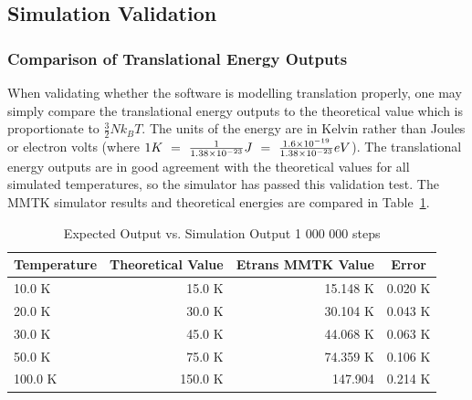 \documentclass[11pt]{article}
\begin{document}
\subsection{Simulation Validation}

\subsubsection{Comparison of Translational Energy Outputs}

When validating whether the software is modelling translation properly, one may simply compare the translational energy outputs to the theoretical value which is proportionate to \begin{math} \frac{3}{2} N k_B T \end{math}. The units of the energy are in Kelvin rather than Joules or electron volts (where \begin{math} 1 K \hspace{0.125cm} = \hspace{0.125cm} \frac{1}{1.38 \times 10^{-23}} J \hspace{0.125cm} = \hspace{0.125cm} \frac{1.6 \times 10^{-19}}{1.38 \times 10^{-23}} eV \end{math}). The translational energy outputs are in good agreement with the theoretical values for all simulated temperatures, so the simulator has passed this validation test. The MMTK simulator results and theoretical energies are compared in Table~\ref{wr-tab-transeng-1}. 


\begin{table}[ht!] 
    \caption{Expected Output vs. Simulation Output 1 000 000 steps}
    \label{wr-tab-transeng-1}
    \centering
    \begin{tabular}{l r r r}
        
        
    \hline
    \multicolumn{1}{c}{\textbf{Temperature}} & \multicolumn{1}{c}{\textbf{Theoretical Value}} & \multicolumn{1}{c}{\textbf{Etrans MMTK Value}} & \multicolumn{1}{c}{\textbf{Error}} \\
    \hline
    10.0 K & 15.0 K & 15.148 K & 0.020 K \\ 
    \hline
    20.0 K & 30.0 K & 30.104 K & 0.043 K \\
    \hline 
    30.0 K & 45.0 K & 44.068 K & 0.063 K \\ 
    \hline 
    50.0 K & 75.0 K & 74.359 K & 0.106 K \\
    \hline 
    100.0 K & 150.0 K & 147.904 & 0.214 K \\
    \hline 
    \end{tabular}
\end{table}
\end{document}
